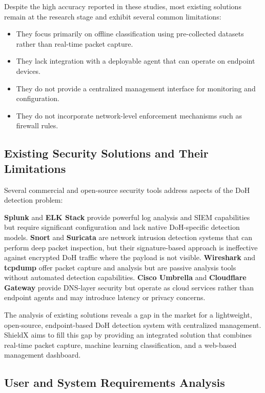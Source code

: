 \documentclass[../Main.tex]{subfiles}
\begin{document}
Despite the high accuracy reported in these studies, most existing solutions remain at the research stage and exhibit several common limitations:
\begin{itemize}
    \item They focus primarily on offline classification using pre-collected datasets rather than real-time packet capture.
    \item They lack integration with a deployable agent that can operate on endpoint devices.
    \item They do not provide a centralized management interface for monitoring and configuration.
    \item They do not incorporate network-level enforcement mechanisms such as firewall rules.
\end{itemize}

\subsection{Existing Security Solutions and Their Limitations}

Several commercial and open-source security tools address aspects of the DoH detection problem:

\textbf{Splunk} and \textbf{ELK Stack} provide powerful log analysis and SIEM capabilities but require significant configuration and lack native DoH-specific detection models. \textbf{Snort} and \textbf{Suricata} are network intrusion detection systems that can perform deep packet inspection, but their signature-based approach is ineffective against encrypted DoH traffic where the payload is not visible. \textbf{Wireshark} and \textbf{tcpdump} offer packet capture and analysis but are passive analysis tools without automated detection capabilities. \textbf{Cisco Umbrella} and \textbf{Cloudflare Gateway} provide DNS-layer security but operate as cloud services rather than endpoint agents and may introduce latency or privacy concerns.

The analysis of existing solutions reveals a gap in the market for a lightweight, open-source, endpoint-based DoH detection system with centralized management. ShieldX aims to fill this gap by providing an integrated solution that combines real-time packet capture, machine learning classification, and a web-based management dashboard.

\subsection{User and System Requirements Analysis}
\end{document}
